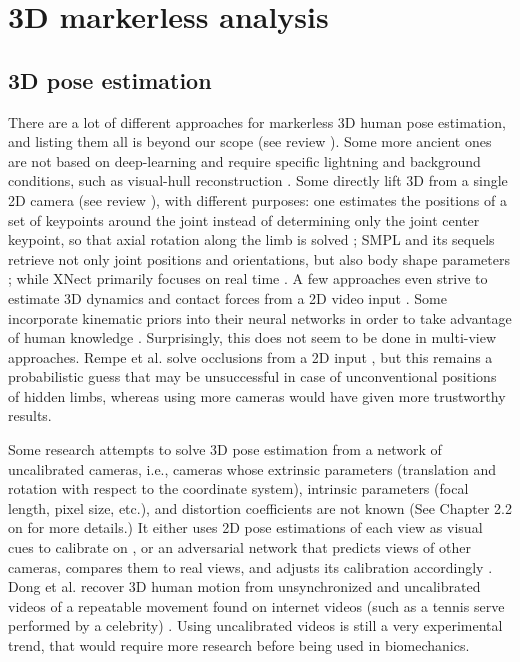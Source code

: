 \FloatBarrier
\clearpage
\section{3D markerless analysis} 
\subsection{3D pose estimation}

There are a lot of different approaches for markerless 3D human pose estimation, and listing them all is beyond our scope (see review \cite{Wang2021a}). Some more ancient ones are not based on deep-learning and require specific lightning and background conditions, such as visual-hull reconstruction \cite{Ceseracciu2014}. Some directly lift 3D from a single 2D camera (see review \cite{Liu2022b}), with different purposes: one estimates the positions of a set of keypoints around the joint instead of determining only the joint center keypoint, so that axial rotation along the limb is solved \cite{Fisch2020}; SMPL and its sequels retrieve not only joint positions and orientations, but also body shape parameters \cite{Loper2015}; while XNect primarily focuses on real time \cite{Mehta2020}. A few approaches even strive to estimate 3D dynamics and contact forces from a 2D video input \cite{Li2019,Rempe2021,Louis2022}. Some incorporate kinematic priors into their neural networks in order to take advantage of human knowledge \cite{Xu2020a}. Surprisingly, this does not seem to be done in multi-view approaches. Rempe et al. solve occlusions from a 2D input \cite{Rempe2020}, but this remains a probabilistic guess that may be unsuccessful in case of unconventional positions of hidden limbs, whereas using more cameras would have given more trustworthy results. 

Some research attempts to solve 3D pose estimation from a network of uncalibrated cameras, i.e., cameras whose extrinsic parameters (translation and rotation with respect to the coordinate system), intrinsic parameters (focal length, pixel size, etc.), and distortion coefficients are not known (See Chapter 2.2 on  for more details.) It either uses 2D pose estimations of each view as visual cues to calibrate on \cite{Takahashi2018, Xu2021, Liu2022a}, or an adversarial network that predicts views of other cameras, compares them to real views, and adjusts its calibration accordingly \cite{Ershadi-Nasab2021}. Dong et al. recover 3D human motion from unsynchronized and uncalibrated videos of a repeatable movement found on internet videos (such as a tennis serve performed by a celebrity) \cite{Dong2020}. Using uncalibrated videos is still a very experimental trend, that would require more research before being used in biomechanics.

